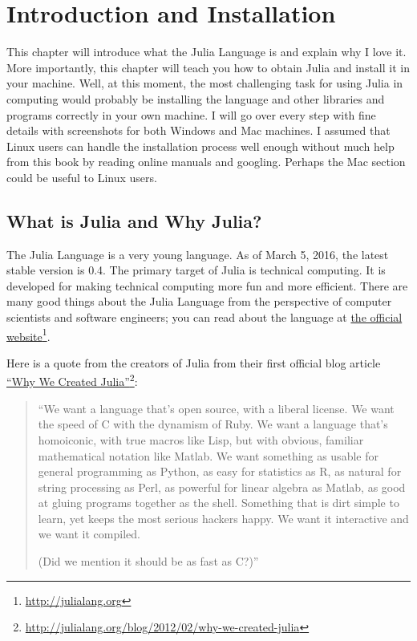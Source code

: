 \chapter{Introduction and Installation}


This chapter will introduce what the Julia Language is and explain why I love it. More importantly, this chapter will teach you how to obtain Julia and install it in your machine. Well, at this moment, the most challenging task for using Julia in computing would probably be installing the language and other libraries and programs correctly in your own machine. I will go over every step with fine details with screenshots for both Windows and Mac machines. I assumed that Linux users can handle the installation process well enough without much help from this book by reading online manuals and googling. Perhaps the Mac section could be useful to Linux users.


\section{What is Julia and Why Julia?}

The Julia Language is a very young language. As of March 5, 2016, the latest stable version is 0.4. The primary target of Julia is technical computing. It is developed for making technical computing more fun and more efficient. There are many good things about the Julia Language from the perspective of computer scientists and software engineers; you can read about the language at \href{http://julialang.org}{the official website}\footnote{\url{http://julialang.org}}.

Here is a quote from the creators of Julia from their first official blog article \href{http://julialang.org/blog/2012/02/why-we-created-julia}{``Why We Created Julia''}\footnote{\url{http://julialang.org/blog/2012/02/why-we-created-julia}}:

\begin{quote}
``We want a language that's open source, with a liberal license. We want the speed of C with the dynamism of Ruby. We want a language that's homoiconic, with true macros like Lisp, but with obvious, familiar mathematical notation like Matlab. We want something as usable for general programming as Python, as easy for statistics as R, as natural for string processing as Perl, as powerful for linear algebra as Matlab, as good at gluing programs together as the shell. Something that is dirt simple to learn, yet keeps the most serious hackers happy. We want it interactive and we want it compiled.

(Did we mention it should be as fast as C?)''
\end{quote}

